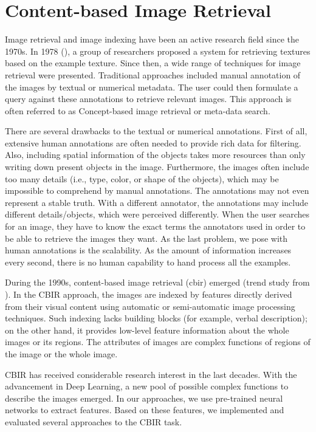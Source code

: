 \chapter{Content-based Image Retrieval}
\label{ch:preliminaries}
\label{ch:content_based}

Image retrieval and image indexing have been an active research field since the 1970s. In 1978 (\cite{tamura1978textural}), a group of researchers proposed a system for retrieving textures based on the example texture. Since then, a wide range of techniques for image retrieval were presented. Traditional approaches included manual annotation of the images by textual or numerical metadata. The user could then formulate a query against these annotations to retrieve relevant images. This approach is often referred to as Concept-based image retrieval or meta-data search.

There are several drawbacks to the textual or numerical annotations. First of all, extensive human annotations are often needed to provide rich data for filtering. Also, including spatial information of the objects takes more resources than only writing down present objects in the image. Furthermore, the images often include too many details (i.e., type, color, or shape of the objects), which may be impossible to comprehend by manual annotations.  The annotations may not even represent a stable truth. With a different annotator, the annotations may include different details/objects, which were perceived differently. When the user searches for an image, they have to know the exact terms the annotators used in order to be able to retrieve the images they want. As the last problem, we pose with human annotations is the scalability. As the amount of information increases every second, there is no human capability to hand process all the examples.

During the 1990s, content-based image retrieval (\acrshort{cbir}) emerged (trend study from \cite{datta2008image}). In the CBIR approach, the images are indexed by features directly derived from their visual content using automatic or semi-automatic image processing techniques. Such indexing lacks building blocks (for example, verbal description); on the other hand, it provides low-level feature information about the whole images or its regions. The attributes of images are complex functions of regions of the image or the whole image.

CBIR has received considerable research interest in the last decades. With the advancement in Deep Learning, a new pool of possible complex functions to describe the images emerged. In our approaches, we use pre-trained neural networks to extract features. Based on these features, we implemented and evaluated several approaches to the CBIR task.

